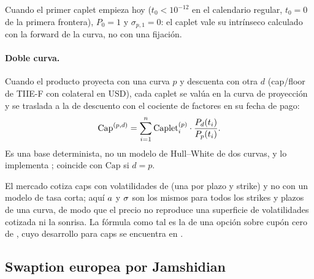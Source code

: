 Cuando el primer caplet empieza hoy ($t_0<10^{-12}$ en el calendario regular, $t_0=0$ de la primera
frontera), $P_0=1$ y $\sigma_{p,1}=0$: el caplet vale su intrínseco calculado con la forward de la curva, no
con una fijación.

\paragraph{Doble curva.} Cuando el producto proyecta con una curva $p$ y descuenta con otra $d$ (cap/floor de
TIIE-F con colateral en USD), cada caplet se valúa en la curva de proyección y se traslada a la de descuento
con el cociente de factores en su fecha de pago:
\begin{equation}\label{eq:cap05-doble-curva}
  \mathrm{Cap}^{(p,d)}=\sum_{i=1}^{n}\mathrm{Caplet}_i^{(p)}\cdot\frac{P_{d}(t_i)}{P_{p}(t_i)} .
\end{equation}
Es una base determinista, no un modelo de Hull--White de dos curvas, y lo implementa
; coincide con $\mathrm{Cap}$ si $d=p$.

\begin{diferencia}
  El mercado cotiza caps con volatilidades de \citet{black1976} (una por plazo y strike) y no con un modelo de
  tasa corta; aquí $a$ y $\sigma$ son los mismos para todos los strikes y plazos de una curva, de modo que
  el precio no reproduce una superficie de volatilidades cotizada ni la sonrisa. La fórmula como tal es la de
  una opción sobre cupón cero de \citet{hull1990}, cuyo desarrollo para caps se encuentra en
  \citet{brigo2006}.
\end{diferencia}

\subsection{Swaption europea por Jamshidian}\label{sec:cap05-swaption}

